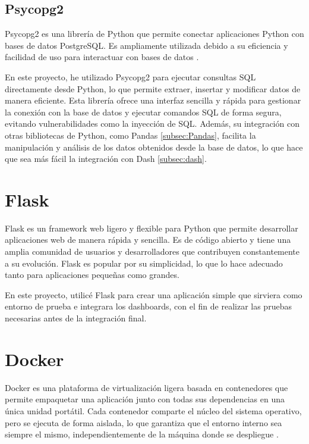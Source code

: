 \documentclass[a4paper, 12pt]{book}
\begin{document}
\subsection{Psycopg2}\label{subsec:psycopg2}
Psycopg2 es una librería de Python que permite conectar aplicaciones Python con bases de datos PostgreSQL. Es ampliamente utilizada debido a su eficiencia y facilidad de uso para interactuar con bases de datos \cite{psycopgDocumentation}.

En este proyecto, he utilizado Psycopg2 para ejecutar consultas SQL directamente desde Python, lo que permite extraer, insertar y modificar datos de manera eficiente. Esta librería ofrece una interfaz sencilla y rápida para gestionar la conexión con la base de datos y ejecutar comandos SQL de forma segura, evitando vulnerabilidades como la inyección de SQL. Además, su integración con otras bibliotecas de Python, como Pandas \ref{subsec:Pandas}, facilita la manipulación y análisis de los datos obtenidos desde la base de datos, lo que hace que sea más fácil la integración con Dash \ref{subsec:dash}.


\section{Flask}
\label{sec:Flask}

Flask es un framework web ligero y flexible para Python que permite desarrollar aplicaciones web de manera rápida y sencilla. Es de código abierto y tiene una amplia comunidad de usuarios y desarrolladores que contribuyen constantemente a su evolución. Flask es popular por su simplicidad, lo que lo hace adecuado tanto para aplicaciones pequeñas como grandes\cite{grinbergflask}.

En este proyecto, utilicé Flask para crear una aplicación simple que sirviera como entorno de prueba e integrara los dashboards, con el fin de realizar las pruebas necesarias antes de la integración final.


\section{Docker}
\label{sec:docker}

Docker es una plataforma de virtualización ligera basada en contenedores que permite empaquetar una aplicación junto con todas sus dependencias en una única unidad portátil. Cada contenedor comparte el núcleo del sistema operativo, pero se ejecuta de forma aislada, lo que garantiza que el entorno interno sea siempre el mismo, independientemente de la máquina donde se despliegue \cite{nickoloff2019docker}.
\end{document}
